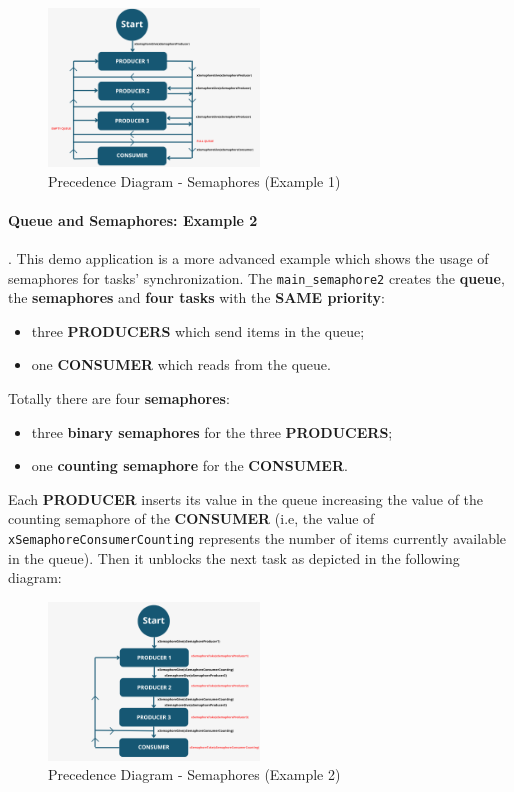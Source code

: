 \begin{figure}[H]
    \centering
    \includegraphics[width=0.5\textwidth]{img/precedence_diagram_semaphore1.png}
    \caption{Precedence Diagram - Semaphores (Example 1)}
    \label{fig:Precedence Diagram - Semaphores (Example 1)}
\end{figure}


\paragraph{Queue and Semaphores: Example 2}.
\label{par:Queue and Semaphores 2}
This demo application is a more advanced example which shows the usage of semaphores for tasks' synchronization.
The \texttt{main\_semaphore2} creates the \textbf{queue}, the \textbf{semaphores} and \textbf{four tasks} with the \textbf{SAME priority}:
\begin{itemize}
    \item three \textbf{PRODUCERS} which send items in the queue;
    \item one \textbf{CONSUMER} which reads from the queue.
\end{itemize}
Totally there are four \textbf{semaphores}:
\begin{itemize}
    \item three \textbf{binary semaphores} for the three \textbf{PRODUCERS};
    \item one \textbf{counting semaphore} for the \textbf{CONSUMER}.
\end{itemize}
Each \textbf{PRODUCER} inserts its value in the queue increasing the value of the counting semaphore of the \textbf{CONSUMER} (i.e, the value of \texttt{xSemaphoreConsumerCounting} represents the number of items currently available in the queue). Then it unblocks the next task as depicted in the following diagram:

\begin{figure}[H]
    \centering
    \includegraphics[width=0.5\textwidth]{img/precedence_diagram_semaphore2.png}
    \caption{Precedence Diagram - Semaphores (Example 2)}
    \label{fig:Precedence Diagram - Semaphores (Example 2)}
\end{figure}

